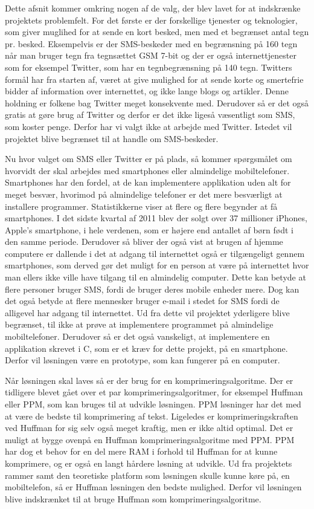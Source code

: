 Dette afsnit kommer omkring nogen af de valg, der blev lavet for at indskrænke projektets problemfelt. For det første er der forskellige tjenester og teknologier, som giver muglihed for at sende en kort besked, men med et begrænset antal tegn pr. besked. Eksempelvis er der SMS-beskeder med en begrænsning på 160 tegn når man bruger tegn fra tegnsættet GSM 7-bit\cite{Pro_1} og der er også internettjenester som for eksempel Twitter, som har en tegnbegrænsning på 140 tegn\cite{pro_af1}. Twitters formål har fra starten af, været at give mulighed for at sende korte og smertefrie bidder af information over internettet, og ikke lange blogs og artikler. Denne holdning er folkene bag Twitter meget konsekvente med\cite{pro_af2}. Derudover så er det også gratis at gøre brug af Twitter og derfor er det ikke ligeså væsentligt som SMS, som koster penge. Derfor har vi valgt ikke at arbejde med Twitter. Istedet vil projektet blive begrænset til at handle om SMS-beskeder.

Nu hvor valget om SMS eller Twitter er på plads, så kommer spørgsmålet om hvorvidt der skal arbejdes med smartphones eller almindelige mobiltelefoner. Smartphones har den fordel, at de kan implementere applikation uden alt for meget besvær, hvorimod på almindelige telefoner er det mere besværligt at installere programmer. Statistikkerne viser at flere og flere begynder at få smartphones\cite{pro_af3}. I det sidste kvartal af 2011 blev der solgt over 37 millioner iPhones, Apple's smartphone, i hele verdenen, som er højere end antallet af børn født i den samme periode\cite{pro_af4}. Derudover så bliver der også vist at brugen af hjemme computere er dallende i det at adgang til internettet også er tilgængeligt gennem smartphones, som derved gør det muligt for en person at være på internettet hvor man ellers ikke ville have tilgang til en almindelig computer\cite{pro_af3}. Dette kan betyde at flere personer bruger SMS, fordi de bruger deres mobile enheder mere. Dog kan det også betyde at flere mennesker bruger e-mail i stedet for SMS fordi de alligevel har adgang til internettet. Ud fra dette vil projektet yderligere blive begrænset, til ikke at prøve at implementere programmet på almindelige mobiltelefoner. Derudover så er det også vanskeligt, at implementere en applikation skrevet i C, som er et kræv for dette projekt, på en smartphone. Derfor vil løsningen være en prototype, som kan fungerer på en computer. 

Når løsningen skal laves så er der brug for en komprimeringsalgoritme. Der er tidligere blevet gået over et par komprimeringsalgoritmer, for eksempel Huffman eller PPM, som kan bruges til at udvikle løsningen. PPM løsninger har det med at være de bedste til komprimering af tekst. Ligeledes er komprimeringskraften ved Huffman for sig selv også meget kraftig, men er ikke altid optimal. Det er muligt at bygge ovenpå en Huffman komprimeringsalgoritme med PPM. PPM har dog et behov for en del mere RAM i forhold til Huffman for at kunne komprimere, og er også en langt hårdere løsning at udvikle. Ud fra projektets rammer samt den teoretiske platform som løsningen skulle kunne køre på, en mobiltelefon, så er Huffman løsningen den bedste mulighed. Derfor vil løsningen blive indskrænket til at bruge Huffman som komprimeringsalgoritme.\cite{pro_af5}

